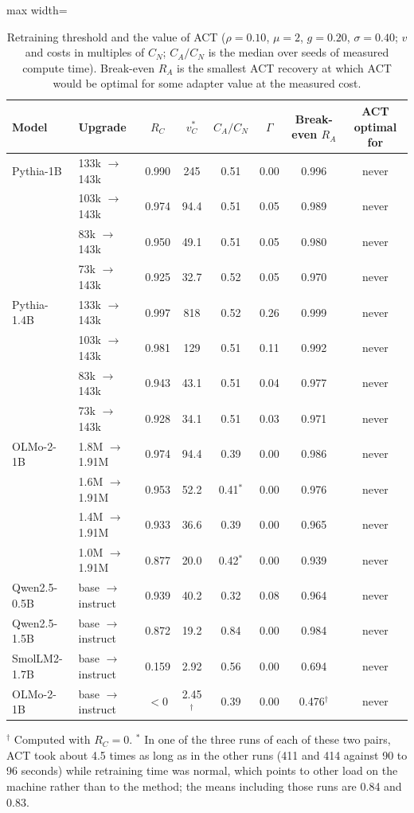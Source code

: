 \documentclass[preprint,12pt,authoryear]{elsarticle}
\begin{document}
\begin{table}[t]
\centering
\caption{Retraining threshold and the value of ACT ($\rho=0.10$, $\mu=2$, $g=0.20$, $\sigma=0.40$; $v$ and costs in multiples of $C_N$; $C_A/C_N$ is the median over seeds of measured compute time). Break-even $R_A$ is the smallest ACT recovery at which ACT would be optimal for some adapter value at the measured cost.}\label{tab:policy}
\small
\begin{adjustbox}{max width=\textwidth}
\begin{tabular}{llcccccc}
\toprule
Model & Upgrade & $R_C$ & $v^*_C$ & $C_A/C_N$ & $\Gamma$ & Break-even $R_A$ & ACT optimal for\\
\midrule
Pythia-1B & 133k $\to$ 143k & 0.990 & 245 & 0.51 & 0.00 & 0.996 & never\\
 & 103k $\to$ 143k & 0.974 & 94.4 & 0.51 & 0.05 & 0.989 & never\\
 & 83k $\to$ 143k & 0.950 & 49.1 & 0.51 & 0.05 & 0.980 & never\\
 & 73k $\to$ 143k & 0.925 & 32.7 & 0.52 & 0.05 & 0.970 & never\\
Pythia-1.4B & 133k $\to$ 143k & 0.997 & 818 & 0.52 & 0.26 & 0.999 & never\\
 & 103k $\to$ 143k & 0.981 & 129 & 0.51 & 0.11 & 0.992 & never\\
 & 83k $\to$ 143k & 0.943 & 43.1 & 0.51 & 0.04 & 0.977 & never\\
 & 73k $\to$ 143k & 0.928 & 34.1 & 0.51 & 0.03 & 0.971 & never\\
OLMo-2-1B & 1.8M $\to$ 1.91M & 0.974 & 94.4 & 0.39 & 0.00 & 0.986 & never\\
 & 1.6M $\to$ 1.91M & 0.953 & 52.2 & 0.41$^\ast$ & 0.00 & 0.976 & never\\
 & 1.4M $\to$ 1.91M & 0.933 & 36.6 & 0.39 & 0.00 & 0.965 & never\\
 & 1.0M $\to$ 1.91M & 0.877 & 20.0 & 0.42$^\ast$ & 0.00 & 0.939 & never\\
Qwen2.5-0.5B & base $\to$ instruct & 0.939 & 40.2 & 0.32 & 0.08 & 0.964 & never\\
Qwen2.5-1.5B & base $\to$ instruct & 0.872 & 19.2 & 0.84 & 0.00 & 0.984 & never\\
SmolLM2-1.7B & base $\to$ instruct & 0.159 & 2.92 & 0.56 & 0.00 & 0.694 & never\\
OLMo-2-1B & base $\to$ instruct & $<0$ & 2.45$^\dagger$ & 0.39 & 0.00 & 0.476$^\dagger$ & never\\
\bottomrule
\end{tabular}
\end{adjustbox}

\smallskip\footnotesize $^\dagger$ Computed with $R_C=0$. $^\ast$ In one of the three runs of each of these two pairs, ACT took about 4.5 times as long as in the other runs (411 and 414 against 90 to 96 seconds) while retraining time was normal, which points to other load on the machine rather than to the method; the means including those runs are 0.84 and 0.83.
\end{table}
\end{document}
